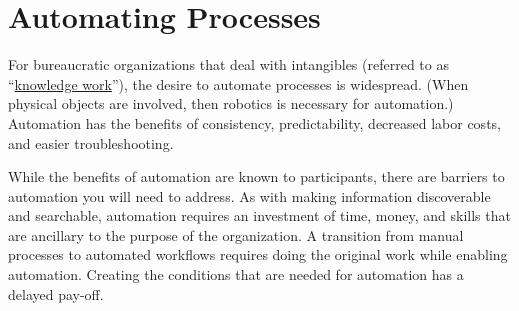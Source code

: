 \section{Automating Processes\label{sec:automating-processes}}




For bureaucratic organizations that deal with intangibles (referred to as ``\href{https://en.wikipedia.org/wiki/Knowledge_worker}{knowledge work}''), the desire to automate processes is widespread. (When physical objects are involved, then robotics is necessary for automation.) Automation has the benefits of consistency, predictability, decreased labor costs, and easier troubleshooting. 

While the benefits of automation are known to participants, there are barriers to automation you will need to address.  
As with making information discoverable and searchable, automation requires an investment of time, money, and skills that are ancillary to the purpose of the organization. A transition from manual processes to automated workflows requires doing the original work while enabling automation. Creating the conditions that are needed for automation has a delayed pay-off. 

